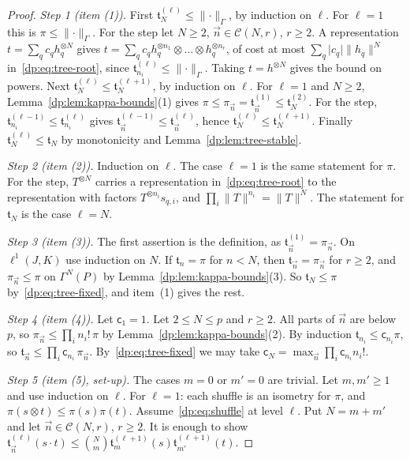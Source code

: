 \documentclass[11pt]{amsart}
\theoremstyle{definition}
\theoremstyle{remark}
\numberwithin{equation}{section}
\newcommand{\abs}[1]{\lvert #1\rvert}
\newcommand{\norm}[1]{\lVert #1\rVert}
\theoremstyle{plain}
\theoremstyle{definition}
\theoremstyle{plain}
\begin{document}
\begin{proof}
\emph{Step 1 (item (1)).} First $\mathfrak t^{(\ell)}_N\le\norm\cdot_\Gamma$, by induction on $\ell$. For $\ell=1$ this is $\pi\le\norm\cdot_\Gamma$. For the step let $N\ge2$, $\vec n\in\mathcal C(N,r)$, $r\ge2$. A representation $t=\sum_qc_qh_q^{\otimes N}$ gives $t=\sum_qc_qh_q^{\otimes n_1}\otimes\dots\otimes h_q^{\otimes n_r}$, of cost at most $\sum_q\abs{c_q}\norm{h_q}^N$ in~\eqref{dp:eq:tree-root}, since $\mathfrak t^{(\ell)}_{n_i}\le\norm\cdot_\Gamma$. Taking $t=h^{\otimes N}$ gives the bound on powers. Next $\mathfrak t^{(\ell)}_N\le\mathfrak t^{(\ell+1)}_N$, by induction on $\ell$. For $\ell=1$ and $N\ge2$, Lemma~\ref{dp:lem:kappa-bounds}(1) gives $\pi\le\pi_{\vec n}=\mathfrak t^{(1)}_{\vec n}\le\mathfrak t^{(2)}_N$. For the step, $\mathfrak t^{(\ell-1)}_{n_i}\le\mathfrak t^{(\ell)}_{n_i}$ gives $\mathfrak t^{(\ell-1)}_{\vec n}\le\mathfrak t^{(\ell)}_{\vec n}$, hence $\mathfrak t^{(\ell)}_N\le\mathfrak t^{(\ell+1)}_N$. Finally $\mathfrak t^{(\ell)}_N\le\mathfrak t_N$ by monotonicity and Lemma~\ref{dp:lem:tree-stable}.

\emph{Step 2 (item (2)).} Induction on $\ell$. The case $\ell=1$ is the same statement for $\pi$. For the step, $T^{\otimes N}$ carries a representation in~\eqref{dp:eq:tree-root} to the representation with factors $T^{\otimes n_i}s_{q,i}$, and $\prod_i\norm T^{n_i}=\norm T^N$. The statement for $\mathfrak t_N$ is the case $\ell=N$.

\emph{Step 3 (item (3)).} The first assertion is the definition, as $\mathfrak t^{(1)}_{\vec n}=\pi_{\vec n}$. On $\ell^1(J,K)$ use induction on $N$. If $\mathfrak t_n=\pi$ for $n<N$, then $\mathfrak t_{\vec n}=\pi_{\vec n}$ for $r\ge2$, and $\pi_{\vec n}\le\pi$ on $\Gamma^N(P)$ by Lemma~\ref{dp:lem:kappa-bounds}(3). So $\mathfrak t_N\le\pi$ by~\eqref{dp:eq:tree-fixed}, and item~(1) gives the rest.

\emph{Step 4 (item (4)).} Let $\mathsf c_1=1$. Let $2\le N\le p$ and $r\ge2$. All parts of $\vec n$ are below $p$, so $\pi_{\vec n}\le\prod_in_i!\,\pi$ by Lemma~\ref{dp:lem:kappa-bounds}(2). By induction $\mathfrak t_{n_i}\le\mathsf c_{n_i}\pi$, so $\mathfrak t_{\vec n}\le\prod_i\mathsf c_{n_i}\,\pi_{\vec n}$. By~\eqref{dp:eq:tree-fixed} we may take $\mathsf c_N=\max_{\vec n}\prod_i\mathsf c_{n_i}n_i!$.

\emph{Step 5 (item (5), set-up).} The cases $m=0$ or $m'=0$ are trivial. Let $m,m'\ge1$ and use induction on $\ell$. For $\ell=1$: each shuffle is an isometry for $\pi$, and $\pi(s\otimes t)\le\pi(s)\pi(t)$. Assume~\eqref{dp:eq:shuffle} at level $\ell$. Put $N=m+m'$ and let $\vec n\in\mathcal C(N,r)$, $r\ge2$. It is enough to show $\mathfrak t^{(\ell)}_{\vec n}(s\cdot t)\le\binom Nm\mathfrak t^{(\ell+1)}_m(s)\mathfrak t^{(\ell+1)}_{m'}(t)$.


\end{proof}
\end{document}
